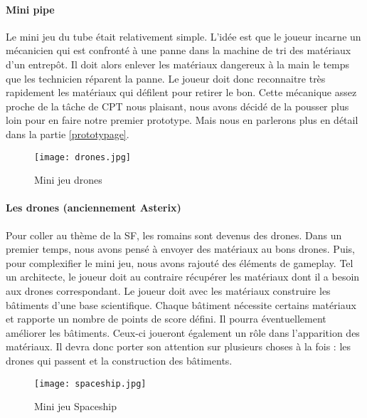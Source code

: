 \paragraph{Mini pipe}Le mini jeu du tube était relativement simple. L'idée est que le joueur incarne un mécanicien qui est confronté à une panne dans la machine de tri des matériaux d'un
entrepôt. Il doit alors enlever les matériaux dangereux à la main le temps que les technicien réparent la panne. Le joueur doit donc reconnaitre très rapidement les matériaux qui
défilent pour retirer le bon. Cette mécanique assez proche de la tâche de CPT nous plaisant, nous avons décidé de la pousser plus loin pour en faire notre premier prototype. Mais nous
en parlerons plus en détail dans la partie \ref{prototypage}.

\begin{wrapfigure}[11]{l}{6cm}
    \vspace{-25pt}
    \begin{center}
    \texttt{[image: drones.jpg]}
    \end{center}
    \captionsetup{labelformat=simpleNumber}
    \caption{Mini jeu drones}
\label{Drones}
\end{wrapfigure}

\paragraph{Les drones (anciennement Asterix)} Pour coller au thème de la \gls{SF}, les romains sont devenus des drones. Dans un premier temps, nous avons pensé à envoyer des matériaux
au bons drones. Puis, pour complexifier le mini jeu, nous avons rajouté des éléments de gameplay. Tel un architecte, le joueur doit au contraire récupérer les matériaux dont
il a besoin aux drones correspondant. Le joueur doit avec les matériaux construire les bâtiments d'une base scientifique. Chaque bâtiment nécessite certains matériaux et rapporte un
nombre de points de score défini. Il pourra éventuellement améliorer les bâtiments. Ceux-ci joueront également un rôle dans l'apparition des matériaux. Il devra donc porter son
attention sur plusieurs choses à la fois : les drones qui passent et la construction des bâtiments.

\newpage

\begin{wrapfigure}[17]{l}{6cm}
    \vspace{-10pt}
    \begin{center}
    \texttt{[image: spaceship.jpg]}
    \end{center}
    \captionsetup{labelformat=simpleNumber}
    \caption{Mini jeu Spaceship}
\label{Spaceship}
\end{wrapfigure}

